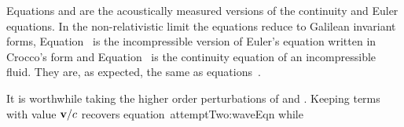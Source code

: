 Equations  and  are the acoustically measured versions of the continuity and Euler equations.
In the non-relativistic limit the equations reduce to Galilean invariant forms, 
Equation~ is the incompressible version of Euler's equation written in Croc\-co's form\cite{Howe1998}
and Equation~ is the continuity equation of an incompressible fluid.
They are, as expected, the same as equations~.

It is worthwhile taking the higher order perturbations of  and .
Keeping terms with value $\textbf{v} / c$ recovers equation~{attemptTwo:waveEqn} while



